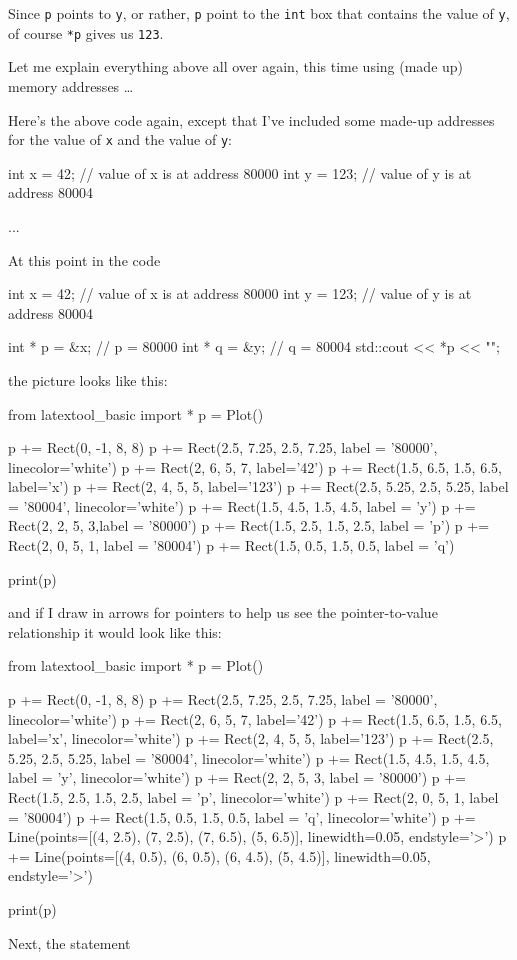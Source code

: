 Since \texttt{p} points to \texttt{y}, or rather, \texttt{p} point to the \texttt{int} box that contains the value of \texttt{y}, of course \texttt{*p} gives us \texttt{123}.

Let me explain everything above all over again, this time using (made up) memory addresses \ldots{} 

Here's the above code again, except that I've included some made-up addresses for the value of \texttt{x} and the value of \texttt{y}:

\begin{consolethree}[escapeinside=||]
int x = 42;         // value of x is at address 80000
int y = 123;        // value of y is at address 80004

...
\end{consolethree}
At this point in the code
\begin{consolethree}[escapeinside=||]
int x = 42;         // value of x is at address 80000
int y = 123;        // value of y is at address 80004

int * p = &x;       // p = 80000
int * q = &y;       // q = 80004
std::cout << *p << "\n";
\end{consolethree}
the picture looks like this:
\begin{python}
from latextool_basic import *
p = Plot()

p += Rect(0, -1, 8, 8)
p += Rect(2.5, 7.25, 2.5, 7.25, label = '80000', linecolor='white')
p += Rect(2, 6, 5, 7, label='42')
p += Rect(1.5, 6.5, 1.5, 6.5, label='x')
p += Rect(2, 4, 5, 5, label='123')
p += Rect(2.5, 5.25, 2.5, 5.25, label = '80004', linecolor='white')
p += Rect(1.5, 4.5, 1.5, 4.5, label = 'y')
p += Rect(2, 2, 5, 3,label = '80000')
p += Rect(1.5, 2.5, 1.5, 2.5, label = 'p')
p += Rect(2, 0, 5, 1, label = '80004')
p += Rect(1.5, 0.5, 1.5, 0.5, label = 'q')

print(p)
\end{python}

and if I draw in arrows for pointers to help us see the pointer-to-value
relationship it would look like this:
\begin{python}
from latextool_basic import *
p = Plot()

p += Rect(0, -1, 8, 8)
p += Rect(2.5, 7.25, 2.5, 7.25, label = '80000', linecolor='white')
p += Rect(2, 6, 5, 7, label='42')
p += Rect(1.5, 6.5, 1.5, 6.5, label='x', linecolor='white')
p += Rect(2, 4, 5, 5, label='123')
p += Rect(2.5, 5.25, 2.5, 5.25, label = '80004', linecolor='white')
p += Rect(1.5, 4.5, 1.5, 4.5, label = 'y', linecolor='white')
p += Rect(2, 2, 5, 3, label = '80000')
p += Rect(1.5, 2.5, 1.5, 2.5, label = 'p', linecolor='white')
p += Rect(2, 0, 5, 1, label = '80004')
p += Rect(1.5, 0.5, 1.5, 0.5, label = 'q', linecolor='white')
p += Line(points=[(4, 2.5), (7, 2.5), (7, 6.5), (5, 6.5)], linewidth=0.05, endstyle='>')
p += Line(points=[(4, 0.5), (6, 0.5), (6, 4.5), (5, 4.5)], linewidth=0.05, endstyle='>')

print(p)
\end{python}
Next, the statement

